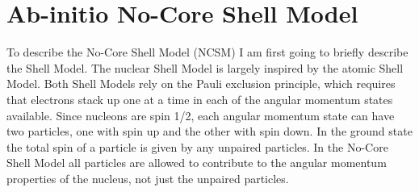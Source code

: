\section{Ab-initio No-Core Shell Model}
To describe the No-Core Shell Model (NCSM) I am first going to briefly describe the Shell Model. The nuclear Shell Model is largely inspired by the atomic Shell Model. Both Shell Models rely on the Pauli exclusion principle, which requires that electrons stack up one at a time in each of the angular momentum states available. Since nucleons are spin 1/2, each angular momentum state can have two particles, one with spin up and the other with spin down. In the ground state the total spin of a particle is given by any unpaired particles. In the No-Core Shell Model all particles are allowed to contribute to the angular momentum properties of the nucleus, not just the unpaired particles.

